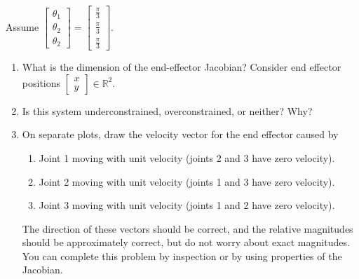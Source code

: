 \documentclass{16384_doc}
\begin{document}
\begin{questions}
    Assume $\begin{bmatrix}
        \theta_1 \\ \theta_2 \\ \theta_2
    \end{bmatrix} = \begin{bmatrix}
        \frac\pi3 \\ \frac\pi3 \\ \frac\pi3
    \end{bmatrix}$.
    
     \begin{enumerate} [label=\alph*.]
        \item \text{[1 point]} What is the dimension of the end-effector Jacobian? Consider
        end effector positions $\begin{bmatrix}
            x \\ y
        \end{bmatrix} \in \mathbb{R}^2$. %
        \begin{tcolorbox}[height=3cm]
        \end{tcolorbox}
        
        \item \text{[1 point]} Is this system underconstrained, overconstrained, or neither?
        Why?
        \begin{tcolorbox}[height=3cm]
        \end{tcolorbox}
        
        \item \text{[6 points]} On separate plots, draw the velocity vector for the end effector
        caused by
        \begin{enumerate} [label=(\roman*)]
          \item Joint 1 moving with unit velocity (joints 2 and 3 have zero velocity).
          \item Joint 2 moving with unit velocity (joints 1 and 3 have zero velocity).
          \item Joint 3 moving with unit velocity (joints 1 and 2 have zero velocity).
        \end{enumerate}
        The direction of these vectors should be correct, and the relative
        magnitudes should be approximately correct, but do not worry about
        exact magnitudes.  You can complete this problem by inspection or by
        using properties of the Jacobian.
        \begin{tcolorbox}[height=6.5cm]
        \end{tcolorbox}


\end{enumerate}
\end{questions}
\end{document}
